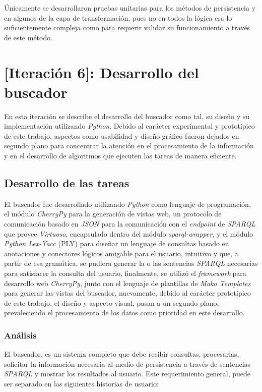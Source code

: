 \begin{itemize}
Únicamente se desarrollaron pruebas unitarias para los métodos de persistencia y en algunos de la capa de transformación, pues no en todos la lógica era lo suficientemente compleja como para requerir validar su funcionamiento a través de este método.

\section{[Iteración 6]: Desarrollo del buscador}
En esta iteración se describe el desarrollo del buscador como tal, su diseño y su implementación utilizando \textit{Python}. Debido al carácter experimental y prototípico de este trabajo, aspectos como usabilidad y diseño gráfico fueron dejados en segundo plano para concentrar la atención en el procesamiento de la información y en el desarrollo de algoritmos que ejecuten las tareas de manera eficiente.

\subsection{Desarrollo de las tareas}
El buscador fue desarrollado utilizando \textit{Python} como lenguaje de programación, el módulo \textit{CherryPy} para la generación de vistas web, un protocolo de comunicación basado en \textit{JSON} para la comunicación con el \textit{endpoint} de \textit{SPARQL} que provee \textit{Virtuoso}, encapsulado dentro del módulo \textit{sparql-wrapper}, y el módulo \textit{Python Lex-Yacc} (PLY) para diseñar un lenguaje de consultas basado en anotaciones y conectores lógicos amigable para el usuario, intuitivo y que, a partir de esa gramática, se pudiera generar la o las sentencias \textit{SPARQL} necesarias para satisfacer la consulta del usuario, finalmente, se utilizó el \textit{framework} para desarrollo web \textit{CherryPy}, junto con el lenguaje de plantillas de \textit{Mako Templates} para generar las vistas del buscador, nuevamente, debido al carácter prototípico de este trabajo, el diseño y aspecto visual, pasan a un segundo plano, prevaleciendo el procesamiento de los datos como prioridad en este desarrollo.

\subsubsection{Análisis}
El buscador, es un sistema completo que debe recibir consultas, procesarlas, solicitar la información necesaria al medio de persistencia a través de sentencias \textit{SPARQL} y mostrar los resultados al usuario. Este requerimiento general, puede ser separado en las siguientes historias de usuario:


\end{itemize}

